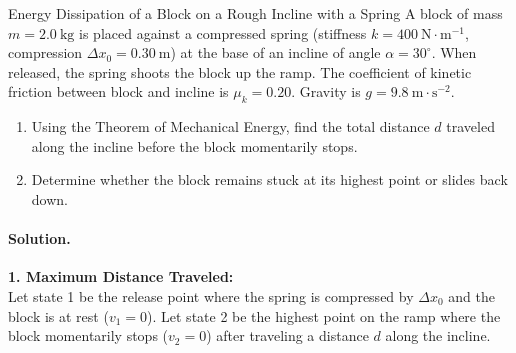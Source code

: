\begin{workedexample}{Energy Dissipation of a Block on a Rough Incline with a Spring}
A block of mass $m = 2.0\ \mathrm{kg}$ is placed against a compressed spring (stiffness $k = 400\ \mathrm{N\cdot m^{-1}}$, compression $\Delta x_0 = 0.30\ \mathrm{m}$) at the base of an incline of angle $\alpha = 30^\circ$. When released, the spring shoots the block up the ramp. The coefficient of kinetic friction between block and incline is $\mu_k = 0.20$. Gravity is $g = 9.8\ \mathrm{m\cdot s^{-2}}$.
\begin{enumerate}[leftmargin=1.4em,itemsep=3pt]
  \item Using the Theorem of Mechanical Energy, find the total distance $d$ traveled along the incline before the block momentarily stops.
  \item Determine whether the block remains stuck at its highest point or slides back down.
\end{enumerate}

\paragraph{Solution.}
\textbf{1. Maximum Distance Traveled:}\\
Let state 1 be the release point where the spring is compressed by $\Delta x_0$ and the block is at rest ($v_1 = 0$).
Let state 2 be the highest point on the ramp where the block momentarily stops ($v_2 = 0$) after traveling a distance $d$ along the incline.


\end{workedexample}
